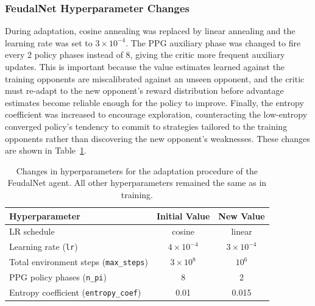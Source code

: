 \documentclass[sigconf,review=false]{acmart}
\begin{document}
\subsubsection{FeudalNet Hyperparameter Changes}
\label{feudal-changes}
During adaptation, cosine annealing was replaced by linear annealing and the learning rate was set to $3 \times 10^{-4}$.
The PPG auxiliary phase was changed to fire every 2 policy phases instead of 8, giving the critic more frequent auxiliary updates. 
This is important because the value estimates learned against the training opponents are miscalibrated against an unseen opponent, and the critic must re-adapt to the new opponent's reward distribution before advantage estimates become reliable enough for the policy to improve. 
Finally, the entropy coefficient was increased to encourage exploration, counteracting the low-entropy converged policy's tendency to commit to strategies tailored to the training opponents rather than discovering the new opponent's weaknesses.
These changes are shown in Table~\ref{tab:feudalnet-hyperparameter-change}.

\begin{table}
\centering
\caption{Changes in hyperparameters for the adaptation procedure of the FeudalNet agent. All other hyperparameters remained the same as in training.}
\label{tab:feudalnet-hyperparameter-change}
\begin{tabular}{lcc}
\toprule
\textbf{Hyperparameter} & \textbf{Initial Value} & \textbf{New Value} \\
\midrule
LR schedule                & cosine             & linear     \\
Learning rate (\texttt{lr})                       & $4 \times 10^{-4}$ & $3 \times 10^{-4}$ \\
Total environment steps (\texttt{max\_steps})     & $3 \times 10^{8}$  & $10^{6}$  \\
PPG policy phases (\texttt{n\_pi})                & 8                & 2         \\
Entropy coefficient (\texttt{entropy\_coef})      & 0.01             & 0.015     \\
\bottomrule
\end{tabular}
\end{table}
\end{document}
